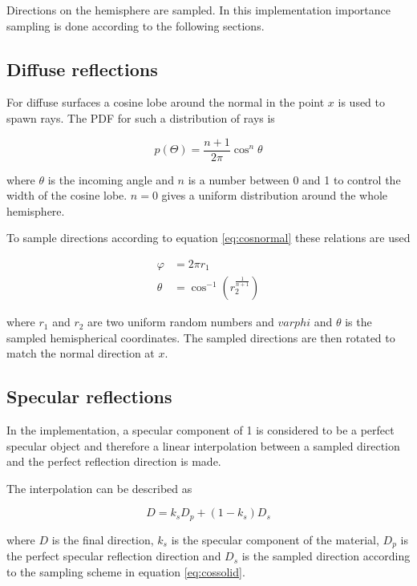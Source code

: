 \documentclass[a4paper]{report}
\begin{document}
Directions on the hemisphere are sampled. In this
implementation importance sampling is done according to the following sections.

\subsection{Diffuse reflections}
For diffuse surfaces a cosine lobe around the normal in the point
\(x\) is used to spawn rays. The PDF for such a distribution of rays
is 

\begin{equation}
  p(\Theta) = \frac{n+1}{2\pi}\cos^n{\theta}
  \label{eq:cosnormal}
\end{equation}

where \(\theta\) is the incoming angle and \(n\) is a number between 0
and 1 to control the width of the cosine lobe. \(n=0\) gives a uniform
distribution around the whole hemisphere.

To sample directions according to equation \ref{eq:cosnormal} these
relations are used

\begin{align}
  \varphi &= 2 \pi r_1 \nonumber \\
  \theta &= \cos^{-1}(r_2^{\frac{1}{n+1}})
\end{align}

where \(r_1\) and \(r_2\) are two uniform random numbers and
\(varphi\) and \(\theta\) is the sampled hemispherical coordinates. The sampled
directions are then rotated to match the normal direction at \(x\).

\subsection{Specular reflections}

In the implementation, a specular component of 1 is considered to be a
perfect specular object and therefore a linear interpolation between a
sampled direction and the perfect reflection direction is made.

The interpolation can be described as

\begin{equation}
  D = k_sD_p + (1-k_s)D_s
\end{equation}

where \(D\) is the final direction, \(k_s\) is the specular
component of the material, \(D_p\) is the perfect specular reflection
direction and \(D_s\) is the sampled direction according to the
sampling scheme in equation \ref{eq:cossolid}.
\end{document}
